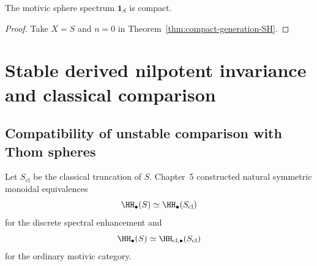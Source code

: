 \begin{corollary}
\label{cor:compact-sphere}
The motivic sphere spectrum $\mathbf 1_S$ is compact.
\end{corollary}

\begin{proof}
Take $X=S$ and $n=0$ in Theorem~\ref{thm:compact-generation-SH}.
\end{proof}

\section{Stable derived nilpotent invariance and classical comparison}
\label{sec:stable-classical-comparison}

\subsection{Compatibility of unstable comparison with Thom spheres}

Let $S_{\mathrm{cl}}$ be the classical truncation of $S$.  Chapter~5 constructed natural symmetric
monoidal equivalences
\[
    \HH_\bullet(S)
    \simeq
    \HH_\bullet(S_{\mathrm{cl}})
\]
for the discrete spectral enhancement and
\[
    \HH_\bullet(S)
    \simeq
    \HH_{\mathrm{cl},\bullet}(S_{\mathrm{cl}})
\]
for the ordinary motivic category.

